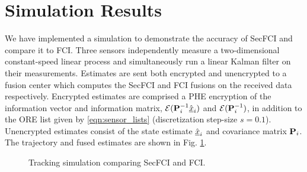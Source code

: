 \documentclass[letterpaper, 10 pt, conference]{ieeeconf}  %
\begin{document}



\section{Simulation Results} \label{sec:results}
We have implemented a simulation to demonstrate the accuracy of SecFCI and compare it to FCI. Three sensors independently measure a two-dimensional constant-speed linear process and simultaneously run a linear Kalman filter on their measurements. Estimates are sent both encrypted and unencrypted to a fusion center which computes the SecFCI and FCI fusions on the received data respectively. Encrypted estimates are comprised a PHE encryption of the information vector and information matrix, $\mathcal{E}({{\mathbf{P}}}^{-1}_i\hat{{\underline{x}}}_i)$ and $\mathcal{E}({{\mathbf{P}}}^{-1}_i)$, in addition to the ORE list given by \eqref{eqn:sensor_lists} (discretization step-size $s=0.1$). Unencrypted estimates consist of the state estimate $\hat{{\underline{x}}}_i$ and covariance matrix ${{\mathbf{P}}}_i$. The trajectory and fused estimates are shown in Fig. \ref{fig:fci_secfci_traj}.
\begin{figure}[tb]
   \vspace{-5pt}
   \begin{center}
      
   \end{center}
   \vspace{-10pt}
   \caption{Tracking simulation comparing SecFCI and FCI.}
   \label{fig:fci_secfci_traj}
\end{figure}
\end{document}
